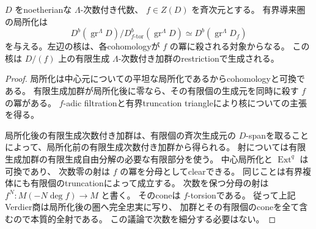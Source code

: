 \begin{lemma}[斉次中心局所化]\label{lem:graded-localization}
 \(D\) をnoetherianな \(\Lambda\)-次数付き代数、
 \(f\in Z(D)\) を斉次元とする。
 有界導来圏の局所化は
 \[
 D^b(\operatorname{gr}^{\Lambda}D)\big/
 D^b_{f\text{-tor}}(\operatorname{gr}^{\Lambda}D)
 \simeq D^b(\operatorname{gr}^{\Lambda}D_f)
 \]
 を与える。左辺の核は、各cohomologyが \(f\) の冪に殺される対象からなる。
 この核は \(D/(f)\) 上の有限生成 \(\Lambda\)-次数付き加群のrestrictionで生成される。
\end{lemma}
\begin{proof}
 局所化は中心元についての平坦な局所化であるからcohomologyと可換である。
 有限生成加群が局所化後に零なら、その有限個の生成元を同時に殺す \(f\) の冪がある。
 \(f\)-adic filtrationと有界truncation triangleにより核についての主張を得る。

 局所化後の有限生成次数付き加群は、有限個の斉次生成元の
 \(D\)-spanを取ることによって、局所化前の有限生成次数付き加群から得られる。
 射については有限生成加群の有限生成自由分解の必要な有限部分を使う。
 中心局所化と \(\operatorname{Ext}^q\) は可換であり、
 次数零の射は \(f\) の冪を分母としてclearできる。
 同じことは有界複体にも有限個のtruncationによって成立する。
 次数を保つ分母の射は \(f^N:M(-N\deg f)\to M\) と書く。
 そのconeは \(f\)-torsionである。
 従って上記Verdier商は局所化後の圏へ完全忠実に写り、
 加群とその有限個のconeを全て含むので本質的全射である。
 この議論で次数を細分する必要はない。
\end{proof}

